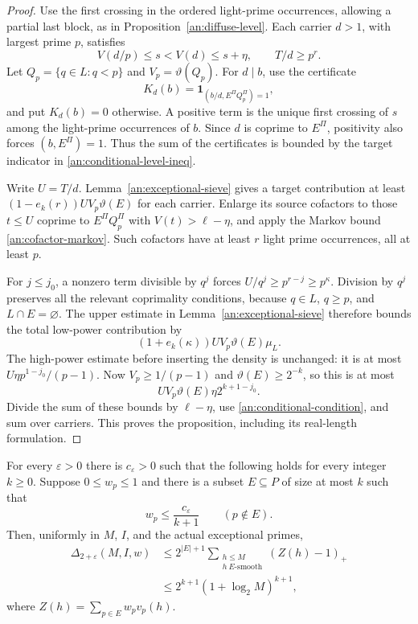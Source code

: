 \begin{proof}
Use the first crossing in the ordered light-prime occurrences, allowing
a partial last block, as in Proposition~\ref{an:diffuse-level}. Each
carrier \(d>1\), with largest prime \(p\), satisfies
\[
 V(d/p)\le s<V(d)\le s+\eta,\qquad T/d\ge p^r.
\]
Let \(Q_p=\{q\in L:q<p\}\) and \(V_p=\vartheta(Q_p)\). For
\(d\mid b\), use the certificate
\[
 K_d(b)=\mathbf1_{(b/d,E^{\Pi}Q_p^{\Pi})=1},
\]
and put \(K_d(b)=0\) otherwise. A positive term is the unique first
crossing of \(s\) among the light-prime occurrences of \(b\). Since
\(d\) is coprime to \(E^{\Pi}\), positivity also forces
\((b,E^{\Pi})=1\). Thus the sum of the certificates is bounded by the
target indicator in \eqref{an:conditional-level-ineq}.

Write \(U=T/d\). Lemma~\ref{an:exceptional-sieve} gives a target
contribution at least
\((1-e_k(r))UV_p\vartheta(E)\) for each carrier. Enlarge its source
cofactors to those \(t\le U\) coprime to \(E^{\Pi}Q_p^{\Pi}\)
with \(V(t)>\ell-\eta\), and apply the Markov bound
\eqref{an:cofactor-markov}. Such cofactors have at least \(r\) light
prime occurrences, all at least \(p\).

For \(j\le j_0\), a nonzero term divisible by \(q^j\) forces
\(U/q^j\ge p^{r-j}\ge p^{\kappa}\). Division by \(q^j\) preserves
all the relevant coprimality conditions, because \(q\in L\),
\(q\ge p\), and \(L\cap E=\varnothing\). The upper estimate in
Lemma~\ref{an:exceptional-sieve} therefore bounds the total low-power
contribution by
\[
 (1+e_k(\kappa))UV_p\vartheta(E)\mu_L.
\]
The high-power estimate before inserting the density is unchanged:
it is at most \(U\eta p^{1-j_0}/(p-1)\). Now
\(V_p\ge1/(p-1)\) and \(\vartheta(E)\ge2^{-k}\), so this is at most
\[
 UV_p\vartheta(E)\eta2^{k+1-j_0}.
\]
Divide the sum of these bounds by \(\ell-\eta\), use
\eqref{an:conditional-condition}, and sum over carriers. This proves
the proposition, including its real-length formulation.
\end{proof}

\begin{theorem}
\label{an:fixed-core}
For every \(\varepsilon>0\) there is \(c_\varepsilon>0\) such that
the following holds for every integer \(k\ge0\). Suppose
\(0\le w_p\le1\) and there is a subset \(E\subseteq P\) of size at most \(k\)
such that
\[
 w_p\le\frac{c_\varepsilon}{k+1}\qquad(p\notin E).
\]
Then, uniformly in \(M\), \(I\), and the actual exceptional primes,
\begin{align}
 \Delta_{2+\varepsilon}(M,I,w)
 &\le 2^{|E|+1}
   \sum_{\substack{h\le M\\h\ E\text{-smooth}}}(Z(h)-1)_+
   \label{an:exact-core-defect}\\
 &\le2^{k+1}(1+\log_2M)^{k+1},
 \label{an:core-defect}
\end{align}
where \(Z(h)=\sum_{p\in E}w_pv_p(h)\).
\end{theorem}

